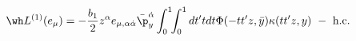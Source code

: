 \begin{equation}
\wh L^{(1)}(e_\mu) = -\frac{b_1}{2}z^\alpha 
e_{\mu,\alpha\dot\alpha}
\bar{\p}_y^{\dot{\alpha}}\int_0^1 \!\! \int_0^1 dt'tdt\Phi(-tt'z,\bar{y})
\kappa(tt'z,y) \ - \ \mbox{h.c.} \label{eq:e1}
\end{equation}

